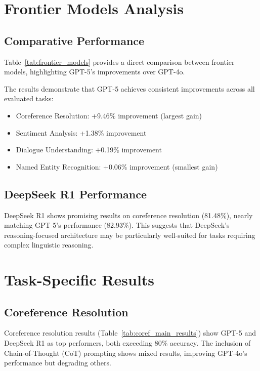 \documentclass[11pt]{article}
\begin{document}
\section{Frontier Models Analysis}

\subsection{Comparative Performance}

Table~\ref{tab:frontier_models} provides a direct comparison between frontier models, highlighting 
GPT-5's improvements over GPT-4o.



The results demonstrate that GPT-5 achieves consistent improvements across all evaluated tasks:
\begin{itemize}
    \item Coreference Resolution: +9.46\% improvement (largest gain)
    \item Sentiment Analysis: +1.38\% improvement  
    \item Dialogue Understanding: +0.19\% improvement
    \item Named Entity Recognition: +0.06\% improvement (smallest gain)
\end{itemize}

\subsection{DeepSeek R1 Performance}

DeepSeek R1 shows promising results on coreference resolution (81.48\%), nearly matching GPT-5's 
performance (82.93\%). This suggests that DeepSeek's reasoning-focused architecture may be particularly 
well-suited for tasks requiring complex linguistic reasoning.

\section{Task-Specific Results}

\subsection{Coreference Resolution}



Coreference resolution results (Table~\ref{tab:coref_main_results}) show GPT-5 and DeepSeek R1 as 
top performers, both exceeding 80\% accuracy. The inclusion of Chain-of-Thought (CoT) prompting 
shows mixed results, improving GPT-4o's performance but degrading others.
\end{document}
